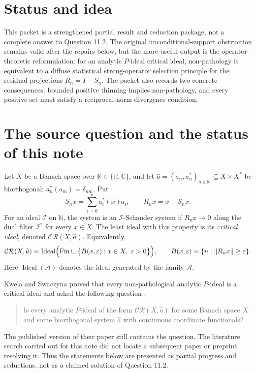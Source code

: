 \documentclass[11pt]{article}
\theoremstyle{definition}
\theoremstyle{remark}
\newcommand{\N}{\mathbb N}
\newcommand{\K}{\mathbb K}
\newcommand{\I}{\mathcal I}
\newcommand{\CR}{\mathcal{CR}}
\newcommand{\Fin}{\mathrm{Fin}}
\newcommand{\Ideal}{\operatorname{Ideal}}
\newcommand{\eps}{\varepsilon}
\begin{document}
\section*{Status and idea}

This packet is a strengthened partial result and reduction package, not a
complete answer to Question 11.2.  The original unconditional-support
obstruction remains valid after the repairs below, but the more useful output
is the operator-theoretic reformulation: for an analytic $P$-ideal critical
ideal, non-pathology is equivalent to a diffuse statistical strong-operator
selection principle for the residual projections $R_n=I-S_n$.  The packet also
records two concrete consequences: bounded positive thinning implies
non-pathology, and every positive set must satisfy a reciprocal-norm
divergence condition.

\section{The source question and the status of this note}

Let $X$ be a Banach space over $\K\in\{\mathbb R,\mathbb C\}$, and let
$\widehat a=(a_n,a_n^*)_{n\in\N}\subseteq X\times X^*$ be biorthogonal:
$a_n^*(a_m)=\delta_{nm}$.  Put
\[
 S_nx=\sum_{i=0}^n a_i^*(x)a_i,
 \qquad
 R_nx=x-S_nx.
\]
For an ideal $\I$ on $\N$, the system is an $\I$-Schauder system if
$R_nx\to0$ along the dual filter $\I^*$ for every $x\in X$.  The least ideal
with this property is its \emph{critical ideal}, denoted $\CR(X,\widehat a)$.
Equivalently,
\begin{equation}\label{eq:critical-definition}
 \CR(X,\widehat a)
 =\Ideal\Bigl(\Fin\cup
   \bigl\{B(x,\eps):x\in X,\ \eps>0\bigr\}\Bigr),
 \qquad
 B(x,\eps)=\{n:\|R_nx\|\geq\eps\}.
\end{equation}
Here $\Ideal(\mathcal A)$ denotes the ideal generated by the family
$\mathcal A$.

Kwela and Swaczyna proved that every non-pathological analytic $P$-ideal is a
critical ideal and asked the following question \cite[Question 11.2]{KS}:
\begin{quote}
Is every analytic $P$-ideal of the form $\CR(X,\widehat a)$ for some Banach
space $X$ and some biorthogonal system $\widehat a$ with continuous coordinate
functionals?
\end{quote}
The published version of their paper still contains the question.  The
literature search carried out for this note did not locate a subsequent paper
or preprint resolving it.  Thus the statements below are presented as partial
progress and reductions, not as a claimed solution of Question 11.2.
\end{document}
